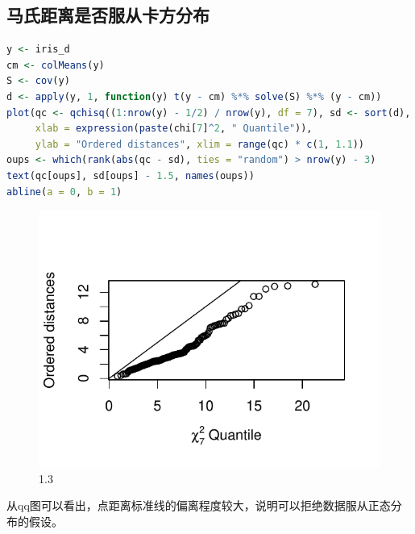 \documentclass[11pt,a4paper]{article}\usepackage[]{graphicx}\usepackage[]{color}
\makeatletter
\def\maxwidth{ %
  \ifdim\Gin@nat@width>\linewidth
    \linewidth
  \else
    \Gin@nat@width
  \fi
}
\newenvironment{knitrout}{}{} %
\makeatother
\begin{document}
	\subsection{马氏距离是否服从卡方分布}
		\begin{lstlisting}[language=R, caption=马氏距离卡方分布检验 ,label={labelkode}]
  y <- iris_d
cm <- colMeans(y)
S <- cov(y)
d <- apply(y, 1, function(y) t(y - cm) %*% solve(S) %*% (y - cm))
plot(qc <- qchisq((1:nrow(y) - 1/2) / nrow(y), df = 7), sd <- sort(d),
     xlab = expression(paste(chi[7]^2, " Quantile")),
     ylab = "Ordered distances", xlim = range(qc) * c(1, 1.1))
oups <- which(rank(abs(qc - sd), ties = "random") > nrow(y) - 3)
text(qc[oups], sd[oups] - 1.5, names(oups))
abline(a = 0, b = 1)
  \end{lstlisting}
		\begin{figure}[H]
\begin{center}
\begin{knitrout}
\color{fgcolor}
\includegraphics[width=\maxwidth]{figure/unnamed-chunk-3-1} 
\end{knitrout}
\caption{1.3}
\end{center}
\end{figure}
从qq图可以看出，点距离标准线的偏离程度较大，说明可以拒绝数据服从正态分布的假设。
  
\end{document}

